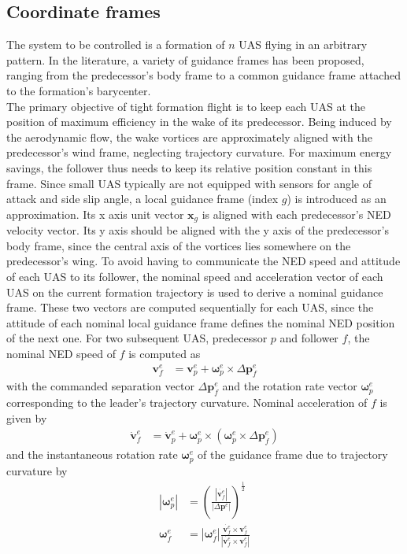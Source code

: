 \documentclass{ifacconf}
\newcommand{\mbf}[1]{\mathbf{#1}}
\providecommand{\mbf}[1]{\mathbf{#1}}
\begin{document}
\subsection{Coordinate frames}
The system to be controlled is a formation of $n$ UAS flying in an arbitrary pattern. In the literature, a variety of guidance frames has been proposed, ranging from the predecessor's body frame to a common guidance frame attached to the formation's barycenter.\\
The primary objective of tight formation flight is to keep each UAS at the position of maximum efficiency in the wake of its predecessor.
Being induced by the aerodynamic flow, the wake vortices are approximately aligned with the predecessor's wind frame, neglecting trajectory curvature. 
For maximum energy savings, the follower thus needs to keep its relative position constant in this frame. Since small UAS typically are not equipped with sensors for angle of attack and side slip angle, a local guidance frame (index $g$) is introduced as an approximation. Its x axis unit vector $\mbf{x}_g$ is aligned with each predecessor's NED velocity vector. Its y axis should be aligned with the y axis of the predecessor's body frame, since the central axis of the vortices lies somewhere on the predecessor's wing.
To avoid having to communicate the NED speed and attitude of each UAS to its follower, the nominal speed and acceleration vector of each UAS on the current formation trajectory is used to derive a nominal guidance frame.
These two vectors are computed sequentially for each UAS, since the attitude of each nominal local guidance frame defines the nominal NED position of the next one.
For two subsequent UAS, predecessor $p$ and follower $f$, the nominal NED speed of $f$ is computed as
\begin{align}
\mbf{v}_f^e &= \mbf{v}_p^e + \mbf{\omega}_p^e \times \Delta \mbf{p}_f^e 
\end{align}
with the commanded separation vector $\Delta \mbf{p}_f^e$ and the rotation rate vector $\mbf{\omega}_p^e$ corresponding to the leader's trajectory curvature. Nominal acceleration of $f$ is given by
\begin{align}
\dot{\mbf{v}}_f^e &= \dot{\mbf{v}}_p^e + \mbf{\omega}_p^e \times (\mbf{\omega}_p^e \times \Delta \mbf{p}^e_f)
\end{align}
and the instantaneous rotation rate $\mbf{\omega}_p^e$ of the guidance frame due to trajectory curvature by
\begin{align}
|\mbf{\omega}_p^e| &= \left(\frac{|\dot{\mbf{v}_f^e}|}{|\Delta \mbf{p}^e|}\right)^\frac{1}{2}\\
\mbf{\omega}_f^e &= |\mbf{\omega}_f^e| 
\frac{\dot{\mbf{v}_f^e} \times \mbf{v}_f^e}{|\dot{\mbf{v}_f^e} \times \mbf{v}_f^e|}
\end{align}
\end{document}
